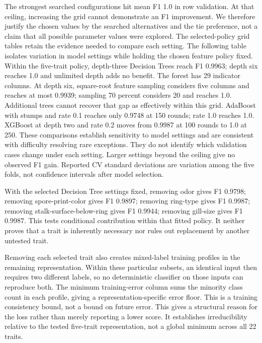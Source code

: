 \documentclass[11pt]{article}
\begin{document}
The strongest searched configurations hit mean F1 1.0 in row validation. At that ceiling, increasing the grid cannot demonstrate an F1 improvement. We therefore justify the chosen values by the searched alternatives and the tie preference, not a claim that all possible parameter values were explored. The selected-policy grid tables retain the evidence needed to compare each setting. The following table isolates variation in model settings while holding the chosen feature policy fixed.
 Within the five-trait policy, depth-three Decision Trees reach F1 0.9963; depth six reaches 1.0 and unlimited depth adds no benefit. The forest has 29 indicator columns. At depth six, square-root feature sampling considers five columns and reaches at most 0.9939; sampling 70 percent considers 20 and reaches 1.0. Additional trees cannot recover that gap as effectively within this grid. AdaBoost with stumps and rate 0.1 reaches only 0.9748 at 150 rounds; rate 1.0 reaches 1.0. XGBoost at depth two and rate 0.2 moves from 0.9987 at 100 rounds to 1.0 at 250. These comparisons establish sensitivity to model settings and are consistent with difficulty resolving rare exceptions. They do not identify which validation cases change under each setting. Larger settings beyond the ceiling give no observed F1 gain.
Reported CV standard deviations are variation among the five folds, not confidence intervals after model selection.

With the selected Decision Tree settings fixed, removing odor gives F1 0.9798; removing spore-print-color gives F1 0.9897; removing ring-type gives F1 0.9987; removing stalk-surface-below-ring gives F1 0.9944; removing gill-size gives F1 0.9987. This tests conditional contribution within that fitted policy. It neither proves that a trait is inherently necessary nor rules out replacement by another untested trait.


Removing each selected trait also creates mixed-label training profiles in the remaining representation. Within these particular subsets, an identical input then requires two different labels, so no deterministic classifier on those inputs can reproduce both. The minimum training-error column sums the minority class count in each profile, giving a representation-specific error floor. This is a training consistency bound, not a bound on future error. This gives a structural reason for the loss rather than merely reporting a lower score. It establishes irreducibility relative to the tested five-trait representation, not a global minimum across all 22 traits.
\end{document}
